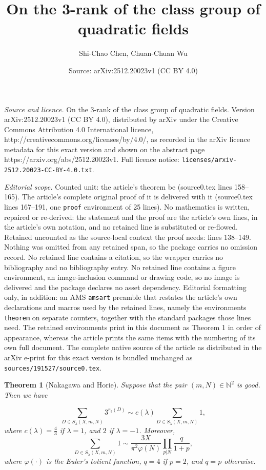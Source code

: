 \documentclass[10pt,a4paper]{amsart}
\title{On the 3-rank of the class group of quadratic fields}
\author{Shi-Chao Chen, Chuan-Chuan Wu}
\date{Source: arXiv:2512.20023v1 (CC BY 4.0)}
\newtheorem{theorem}{Theorem}
\begin{document}
\maketitle

\noindent\emph{Source and licence.} On the 3-rank of the class group of quadratic fields. Version arXiv:2512.20023v1 (CC BY 4.0), distributed by arXiv under the Creative Commons Attribution 4.0 International licence, http://creativecommons.org/licenses/by/4.0/, as recorded in the arXiv licence metadata for this exact version and shown on the abstract page https://arxiv.org/abs/2512.20023v1. Full licence notice: \texttt{licenses/arxiv-2512.20023-CC-BY-4.0.txt}.\par\smallskip

\noindent\textit{Editorial scope.} Counted unit: the article's theorem be (source0.tex lines 158--165). The article's complete original proof of it is delivered with it (source0.tex lines 167--191, one \texttt{proof} environment of 25 lines). No mathematics is written, repaired or re-derived: the statement and the proof are the article's own lines, in the article's own notation, and no retained line is substituted or re-flowed.  Retained uncounted as the source-local context the proof needs: lines 138--149.  Nothing was omitted from any retained span, so the package carries no omission record.  No retained line contains a citation, so the wrapper carries no bibliography and no bibliography entry.  No retained line contains a figure environment, an image-inclusion command or drawing code, so no image is delivered and the package declares no asset dependency.  Editorial formatting only, in addition: an AMS \texttt{amsart} preamble that restates the article's own declarations and macros used by the retained lines, namely the environments \texttt{theorem} on separate counters, together with the standard packages those lines need.  The retained environments print in this document as Theorem 1 in order of appearance, whereas the article prints the same items with the numbering of its own full document.  The complete native source of the article as distributed in the arXiv e-print for this exact version is bundled unchanged as \texttt{sources/191527/source0.tex}.
\begin{theorem}[Nakagawa and Horie]\label{nh}
Suppose that the pair $(m,N)\in\mathbb{N}^2$ is good. Then we have


    \[
    \sum_{D \in S_{\lambda}(X, m, N)} 3^{r_{3}(D)} \sim c(\lambda)  \sum_{D \in S_{\lambda}(X, m, N)}1,
    \]
    where $c(\lambda)=\frac{4}{3}$ if $\lambda=1$, and $2$ if $\lambda=-1$. Moreover,
    \[\sum_{D \in S_{\lambda}(X, m, N)}1\sim \frac{3X}{\pi^2 \varphi(N)}\prod_{p|N}\frac{q}{1+p},\]
where $\varphi(\cdot)$ is the Euler's totient function, $q=4$ if $p=2$, and $q=p$ otherwise.

\end{theorem}
\end{document}
